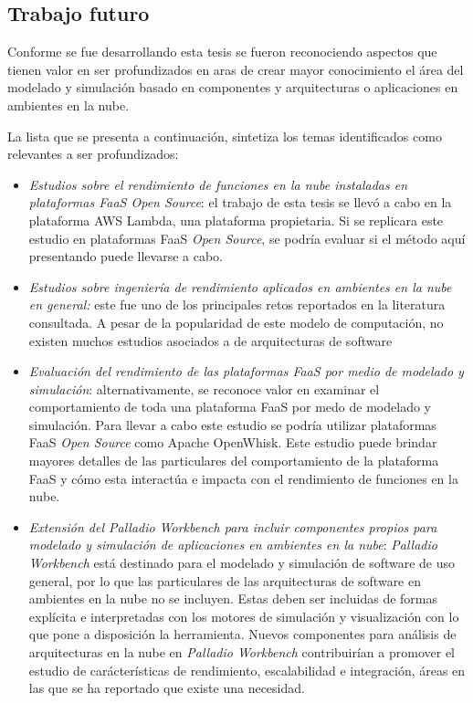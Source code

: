 \subsection{Trabajo futuro}
Conforme se fue desarrollando esta tesis se fueron reconociendo aspectos que tienen valor en ser profundizados en aras de crear mayor conocimiento el área del modelado y simulación basado en componentes y arquitecturas o aplicaciones en ambientes en la nube.

La lista que se presenta a continuación, sintetiza los temas identificados como relevantes a ser profundizados:
\begin{itemize}
    \item \emph{Estudios sobre el rendimiento de funciones en la nube instaladas en plataformas FaaS \emph{Open Source}}: el trabajo de esta tesis se llevó a cabo en la plataforma AWS Lambda, una plataforma propietaria. Si se replicara este estudio en plataformas FaaS \emph{Open Source}, se podría evaluar si el método aquí presentando puede llevarse a cabo.
    \item \emph{Estudios sobre ingeniería de rendimiento aplicados en ambientes en la nube en general:} este fue uno de los principales retos reportados en la literatura consultada. A pesar de la popularidad de este modelo de computación, no existen muchos estudios asociados a de arquitecturas de software 
    \item \emph{Evaluación del rendimiento de las plataformas FaaS por medio de modelado y simulación}: alternativamente, se reconoce valor en examinar el comportamiento de toda una plataforma FaaS por medo de modelado y simulación. Para llevar a cabo este estudio se podría utilizar plataformas FaaS \emph{Open Source} como Apache OpenWhisk. Este estudio puede brindar mayores detalles de las particulares del comportamiento de la plataforma FaaS y cómo esta interactúa e impacta con el rendimiento de funciones en la nube.
    \item \emph{Extensión del Palladio Workbench para incluir componentes propios para modelado y simulación de aplicaciones en ambientes en la nube}: \emph{Palladio Workbench} está destinado para el modelado y simulación de software de uso general, por lo que las particulares de las arquitecturas de software en ambientes en la nube no se incluyen. Estas deben ser incluidas de formas explícita e interpretadas con los motores de simulación y visualización con lo que pone a disposición la herramienta. Nuevos componentes para análisis de arquitecturas en la nube en \emph{Palladio Workbench} contribuirían a promover el estudio de carácterísticas de rendimiento, escalabilidad e integración, áreas en las que se ha reportado que existe una necesidad.

\end{itemize}
